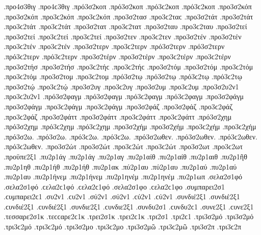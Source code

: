 {.προ4σ3θιγ .προ4ϲ3θιγ   %
.πρό3σ2κοπ .πρό3σ2κοπ .πρό3ϲ2κοπ .πρό3ϲ2κοπ   %
.προ3σ2κόπ .προ3σ2κόπ .προ3ϲ2κόπ .προ3ϲ2κόπ 
.προ3σ2τασ .προ3ϲ2ταϲ   %
.προ3σ2τάτ .προ3σ2τάτ .προ3ϲ2τάτ .προ3ϲ2τάτ   %
.προ3σ2τατ .προ3ϲ2τατ   %
.προ3σ2ταυ .προ3ϲ2ταυ   %
.προ3σ2τεί .προ3σ2τεί .προ3ϲ2τεί .προ3ϲ2τεί   %
.προ3σ2τεν .προ3ϲ2τεν   %
.προ3σ2τέν .προ3σ2τέν .προ3ϲ2τέν .προ3ϲ2τέν   %
.προ3σ2τερν .προ3ϲ2τερν   %
.πρό3σ2τερν .πρό3σ2τερν .πρό3ϲ2τερν .πρό3ϲ2τερν   %
.προ3σ2τέρν .προ3σ2τέρν .προ3ϲ2τέρν .προ3ϲ2τέρν 
.προ3σ2τήσ .προ3σ2τήσ .προ3ϲ2τήϲ .προ3ϲ2τήϲ   %
.προ3σ2τόμ .προ3σ2τόμ .προ3ϲ2τόμ .προ3ϲ2τόμ   %
.προ3σ2τομ .προ3ϲ2τομ 
.πρό3σ2τῳ .πρό3σ2τῳ .πρό3ϲ2τῳ .πρό3ϲ2τῳ   %
.προ3σ2τῴ .προ3ϲ2τῴ 
.προ3σ2υγ .προ3ϲ2υγ   %
.προ3σ2υμ .προ3ϲ2υμ   %
.προ3σ2υ2ν1 .προ3ϲ2υ2ν1   %
.πρό3σ2φαγμ .πρό3σ2φαγμ .πρό3ϲ2φαγμ .πρό3ϲ2φαγμ   %
.προ3σ2φάγμ .προ3σ2φάγμ .προ3ϲ2φάγμ .προ3ϲ2φάγμ 
.προ3σ2φάζ .προ3σ2φάζ .προ3ϲ2φάζ .προ3ϲ2φάζ   %
.προ3σ2φάττ .προ3σ2φάττ .προ3ϲ2φάττ .προ3ϲ2φάττ   %
.πρό3σ2χημ .πρό3σ2χημ .πρό3ϲ2χημ .πρό3ϲ2χημ   %
.προ3σ2χήμ .προ3σ2χήμ .προ3ϲ2χήμ .προ3ϲ2χήμ 
.πρό3σ2ω. .πρό3σ2ω. .πρό3ϲ2ω. .πρό3ϲ2ω. 
.πρό3σ2ωθεν. .πρό3σ2ωθεν. .πρό3ϲ2ωθεν. .πρό3ϲ2ωθεν. 
.προ3σ2ώτ .προ3σ2ώτ .προ3ϲ2ώτ .προ3ϲ2ώτ   %
.προ3σ2ωτ .προ3ϲ2ωτ 
.προϋπε2ξ1   %
.πυ2ρ1άγ .πυ2ρ1άγ   %
.πυ2ρ1αγ 
.πυ2ρ1αίθ .πυ2ρ1αίθ   %
.πυ2ρ1αιθ   %
.πυ2ρ1ῆθ   %
.πυ2ρ1ηθ   %
.πυ2ρ1ήθ .πυ2ρ1ήθ   %
.πυ2ρ1ακ   %
.πύ2ρ1αυ .πύ2ρ1αυ   %
.πυ2ρ1αύ .πυ2ρ1αύ 
.πυ2ρ1αυ   %
.πυ2ρ1ήνεμ .πυ2ρ1ήνεμ   %
.πυ2ρ1ηνέμ .πυ2ρ1ηνέμ 
.πυ2ρ1ωπ   %
.σελα2σ1φό .σελα2σ1φό .ϲελα2ϲ1φό .ϲελα2ϲ1φό   %
.σελα2σ1φο .ϲελα2ϲ1φο 
.συμπαρει2σ1 .ϲυμπαρει2ϲ1   %
.συ2ν1 .ϲυ2ν1 
.σύ2ν1 .σύ2ν1 .ϲύ2ν1 .ϲύ2ν1   %
.συνδιέ2ξ1 .συνδιέ2ξ1 .ϲυνδιέ2ξ1 .ϲυνδιέ2ξ1   %
.συνδιε2ξ1 .ϲυνδιε2ξ1   %
.συνδυ2σ1 .ϲυνδυ2ϲ1   %
.συνε2ξ1 .ϲυνε2ξ1   %
.τεσσαρε2σ1κ .τεϲϲαρε2ϲ1κ   %
.τρει2σ1κ .τρει2ϲ1κ   %
.τρι2σ1 .τρι2ϲ1 
.τρι3σ2μό .τρι3σ2μό .τρι3ϲ2μό .τρι3ϲ2μό   %
.τρι3σ2μο .τρι3ϲ2μο 
.τρι3σ2μῶ .τρι3ϲ2μῶ 
.τρι3σ2π .τρι3ϲ2π   %
}
